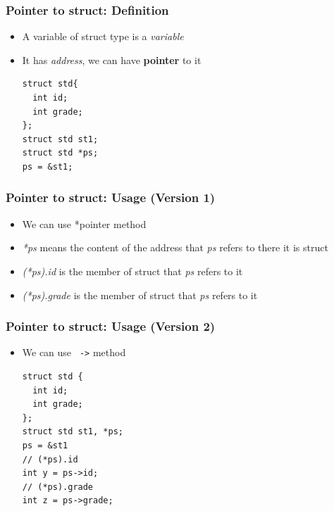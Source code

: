 \documentclass{../c-lecture}
\begin{document}
\begin{frame}[fragile]
  \frametitle{Pointer to struct: Definition}
  \begin{itemize}
    \item
      A variable of struct type is a \textit{\color{YellowOrange} variable}

    \item
      It has \textit{\color{LimeGreen} address}, we can have
      \textbf{\color{Cyan} pointer} to it

    \begin{verbatim}
struct std{
  int id;
  int grade;
};
struct std st1;
struct std *ps;
ps = &st1;
    \end{verbatim}
  \end{itemize}
\end{frame}

\begin{frame}
  \frametitle{Pointer to struct: Usage (Version 1)}
  \begin{itemize}
    \item We can use *pointer method
    \item
      \textit{\color{LimeGreen} *ps} means the content of the address that
      \textit{\color{YellowOrange} ps} refers to there \textrightarrow it is struct

    \item
      \textit{\color{Cyan} (*ps).id} is the member of struct that
      \textit{\color{YellowOrange} ps} refers to it

    \item
      \textit{\color{Cyan} (*ps).grade} is the member of struct that
      \textit{\color{YellowOrange} ps} refers to it

  \end{itemize}
\end{frame}

\begin{frame}[fragile]
  \frametitle{Pointer to struct: Usage (Version 2)}
  \begin{itemize}
    \item We can use \texttt{\color{Orange} ->} method
    \begin{verbatim}
struct std {
  int id;
  int grade;
};
struct std st1, *ps;
ps = &st1
// (*ps).id
int y = ps->id;
// (*ps).grade
int z = ps->grade;
    \end{verbatim}
  \end{itemize}
\end{frame}
\end{document}
